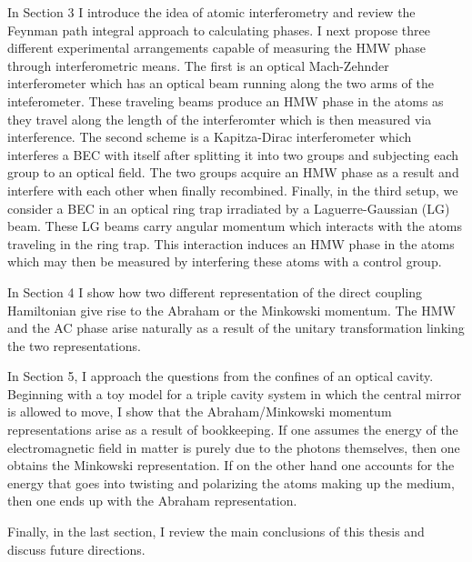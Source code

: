 In Section 3 I introduce the idea of atomic interferometry and review the Feynman path integral approach to calculating phases.  I next propose three different experimental arrangements capable of measuring the HMW phase through interferometric means.  The first is an optical Mach-Zehnder interferometer which has an optical beam running along the two arms of the inteferometer.  These traveling beams produce an HMW phase in the atoms as they travel along the length of the interferomter which is then measured via interference.  The second scheme is a Kapitza-Dirac interferometer which interferes a BEC with itself after splitting it into two groups and subjecting each group to an optical field.  The two groups acquire an HMW phase as a result and interfere with each other when finally recombined.  Finally, in the third setup, we consider a BEC in an optical ring trap irradiated by a Laguerre-Gaussian (LG) beam.  These LG beams carry angular momentum which interacts with the atoms traveling in the ring trap.  This interaction induces an HMW phase in the atoms which may then be measured by interfering these atoms with a control group.

In Section 4 I show how two different representation of the direct coupling Hamiltonian give rise to the Abraham or the Minkowski momentum.  The HMW and the AC phase arise naturally as a result of the unitary transformation linking the two representations.  

In Section 5, I approach the questions from the confines of an optical cavity.  Beginning with a toy model for a triple cavity system in which the central mirror is allowed to move, I show that the Abraham/Minkowski momentum representations arise as a result of bookkeeping.  If one assumes the energy of the electromagnetic field in matter is purely due to the photons themselves, then one obtains the Minkowski representation.  If on the other hand one accounts for the energy that goes into twisting and polarizing the atoms making up the medium, then one ends up with the Abraham representation.

Finally, in the last section, I review the main conclusions of this thesis and discuss future directions.

\newpage




